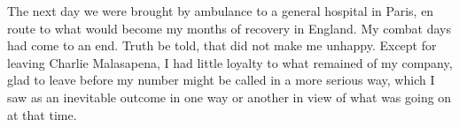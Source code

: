 \documentclass[../m3y]{subfiles}
\begin{document}
The next day we were brought by ambulance to a general hospital in Paris, en route to what would become my months of recovery in England. My combat days had come to an end. Truth be told, that did not make me unhappy. Except for leaving Charlie Malasapena, I had little loyalty to what remained of my company, glad to leave before my number might be called in a more serious way, which I saw as an inevitable outcome in one way or another in view of what was going on at that time.
\label{end-of-action}
\end{document}
